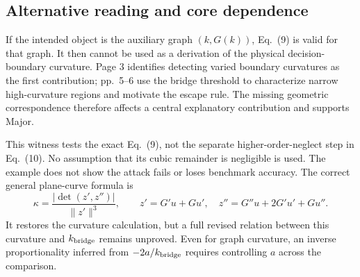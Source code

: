\documentclass[10pt]{article}
\begin{document}
\subsection*{Alternative reading and core dependence}
If the intended object is the auxiliary graph \((k,G(k))\), Eq. (9) is valid for that graph. It then cannot be used as a derivation of the physical decision-boundary curvature. Page 3 identifies detecting varied boundary curvatures as the first contribution; pp. 5–6 use the bridge threshold to characterize narrow high-curvature regions and motivate the escape rule. The missing geometric correspondence therefore affects a central explanatory contribution and supports Major.\par
This witness tests the exact Eq. (9), not the separate higher-order-neglect step in Eq. (10). No assumption that its cubic remainder is negligible is used. The example does not show the attack fails or loses benchmark accuracy. The correct general plane-curve formula is \[\kappa=\frac{|\det(z',z'')|}{\|z'\|^3},\qquad
z'=G'u+Gu',\quad z''=G''u+2G'u'+Gu''.\] It restores the curvature calculation, but a full revised relation between this curvature and \(k_{\rm bridge}\) remains unproved. Even for graph curvature, an inverse proportionality inferred from \(-2a/k_{\rm bridge}\) requires controlling \(a\) across the comparison.\par
\end{document}
